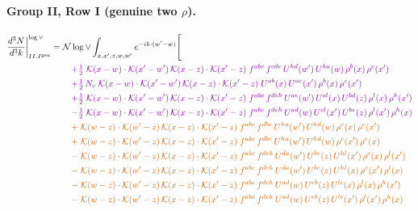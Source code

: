 \documentclass[10pt]{article}
\numberwithin{equation}{section}
\newcommand{\NNv}{\mathcal N\log\vee}
\begin{document}
\paragraph{Group II, Row I (genuine two $\rho$).}
\begin{align}
\frac{d^3N}{d^3k}\bigg|^{\log\vee}_{II.I^{\rm gen}}={}&\NNv\int_{x,x',z,w,w'}e^{-ik\cdot(w'-w)}\Bigg[\notag\\
&\quad{\color{CC}+\tfrac{1}{2}\;\mathcal{K}(x-w)\cdot\mathcal{K}(x'-w')\,\mathcal{K}(x-z)\cdot\mathcal{K}(x'-z)\;f^{abc}\,f^{cde}\,U^{hd}(w')\,U^{ha}(w)\,\rho^{b}(x)\,\rho^{e}(x')}\notag\\
&\quad{\color{CC}+\tfrac{1}{2}\,N_c\;\mathcal{K}(x-w)\cdot\mathcal{K}(x'-w')\,\mathcal{K}(x-z)\cdot\mathcal{K}(x'-z)\;U^{ab}(x)\,U^{ac}(x')\,\rho^{b}(x)\,\rho^{c}(x')}\notag\\
&\quad{\color{CC}+\tfrac{1}{2}\;\mathcal{K}(x-w)\cdot\mathcal{K}(x'-w')\,\mathcal{K}(x-z)\cdot\mathcal{K}(x'-z)\;f^{abc}\,f^{deh}\,U^{ae}(w')\,U^{cl}(x)\,U^{bd}(z)\,\rho^{l}(x)\,\rho^{h}(x')}\notag\\
&\quad{\color{CC}-\tfrac{1}{2}\;\mathcal{K}(x-w)\cdot\mathcal{K}(x'-w')\,\mathcal{K}(x-z)\cdot\mathcal{K}(x'-z)\;f^{abc}\,f^{deh}\,U^{ad}(w)\,U^{cl}(x')\,U^{be}(z)\,\rho^{l}(x')\,\rho^{h}(x)}\notag\\
&\quad{\color{BFK}+\;\mathcal{K}(w-z)\cdot\mathcal{K}(w'-z)\,\mathcal{K}(x-z)\cdot\mathcal{K}(x'-z)\;f^{abc}\,f^{dbe}\,U^{ha}(w')\,U^{hd}(w)\,\rho^{c}(x)\,\rho^{e}(x')}\notag\\
&\quad{\color{BFK}+\;\mathcal{K}(w-z)\cdot\mathcal{K}(w'-z)\,\mathcal{K}(x-z)\cdot\mathcal{K}(x'-z)\;f^{abc}\,f^{dbe}\,U^{ha}(w')\,U^{hd}(w)\,\rho^{c}(x')\,\rho^{e}(x)}\notag\\
&\quad{\color{BFK}-\;\mathcal{K}(w-z)\cdot\mathcal{K}(w'-z)\,\mathcal{K}(x-z)\cdot\mathcal{K}(x'-z)\;f^{abc}\,f^{deh}\,U^{da}(w')\,U^{be}(z)\,U^{hl}(x')\,\rho^{c}(x)\,\rho^{l}(x')}\notag\\
&\quad{\color{BFK}-\;\mathcal{K}(w-z)\cdot\mathcal{K}(w'-z)\,\mathcal{K}(x-z)\cdot\mathcal{K}(x'-z)\;f^{abc}\,f^{deh}\,U^{da}(w')\,U^{be}(z)\,U^{hl}(x)\,\rho^{c}(x')\,\rho^{l}(x)}\notag\\
&\quad{\color{BFK}-\;\mathcal{K}(w-z)\cdot\mathcal{K}(w'-z)\,\mathcal{K}(x-z)\cdot\mathcal{K}(x'-z)\;f^{abc}\,f^{deh}\,U^{ad}(w)\,U^{eb}(z)\,U^{lc}(x)\,\rho^{l}(x)\,\rho^{h}(x')}\notag\\
&\quad{\color{BFK}-\;\mathcal{K}(w-z)\cdot\mathcal{K}(w'-z)\,\mathcal{K}(x-z)\cdot\mathcal{K}(x'-z)\;f^{abc}\,f^{deh}\,U^{ad}(w)\,U^{eb}(z)\,U^{lc}(x')\,\rho^{l}(x')\,\rho^{h}(x)}\notag\\

\end{align}
\end{document}

